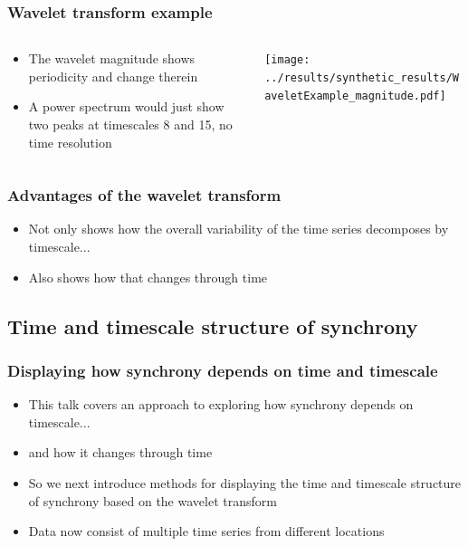 \documentclass{beamer}
\begin{document}
\begin{frame}
\frametitle{Wavelet transform example}
\begin{columns}[c]
\begin{column}{6cm}
\begin{itemize}
\item The wavelet magnitude shows periodicity and change therein
\item A power spectrum would just show two peaks at timescales 8 and 15, no time resolution
\end{itemize}
\end{column}
\begin{column}{6cm}
\texttt{[image: ../results/synthetic\_results/WaveletExample\_magnitude.pdf]}
\end{column}
\end{columns}
\end{frame}

{
\begin{frame}
\frametitle{Advantages of the wavelet transform}
\begin{itemize}
\item Not only shows how the overall variability of the time series decomposes by timescale...
\item Also shows how that changes through time
\end{itemize}
\end{frame}}

\subsection{Time and timescale structure of synchrony}

{
\begin{frame}
\frametitle{Displaying how synchrony depends on time and timescale}
\begin{itemize}
\item This talk covers an approach to exploring how synchrony depends on timescale...
\item and how it changes through time
\item So we next introduce methods for displaying the time and timescale structure of synchrony
based on the wavelet transform
\item Data now consist of multiple time series from different locations
\end{itemize}
\end{frame}}
\end{document}
